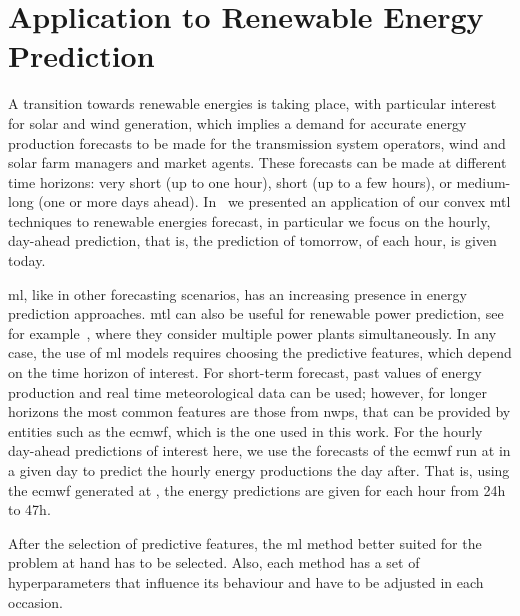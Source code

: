 \section{Application to Renewable Energy Prediction}\label{sec:convexmlt_renewable}

A transition towards renewable energies is taking place, with particular interest for solar and wind generation, which implies a demand for accurate energy production forecasts to be made for the transmission system operators, wind and solar farm managers and market agents. These forecasts can be made at different time horizons: very short (up to one hour), short (up to a few hours), or medium-long (one or more days ahead).
In~\citet{ruiz2020_energies} we presented an application of our convex \acrshort{mtl} techniques to renewable energies forecast, in particular we focus on the hourly, day-ahead prediction, that is, the prediction of tomorrow, of each hour, is given today.

\acrfull{ml}, like in other forecasting scenarios, has an increasing presence in energy prediction approaches. 
\acrshort{mtl} can also be useful for renewable power prediction, see for example~\citet{Dorado-MorenoNG20}, where they consider multiple power plants simultaneously.
%
In any case, the use of \acrshort{ml} models requires choosing the predictive features, which depend on the time horizon of interest. 
For short-term forecast, past values of energy production and real time meteorological data can be used; however, for longer horizons the most common features are those from \acrfull{nwps}, that can be provided by entities such as the \acrfull{ecmwf}, which is the one used in this work.
For the hourly day-ahead predictions of interest here, we use the forecasts of the \acrshort{ecmwf} run at  in a given day to predict the hourly energy productions the day after. That is, using the \acrshort{ecmwf} generated at , the energy predictions are given for each hour from {24}h to {47}h.

After the selection of predictive features, the \acrshort{ml} method better suited for the problem at hand has to be selected. Also, each method has a set of hyperparameters that influence its behaviour and have to be adjusted in each occasion.



